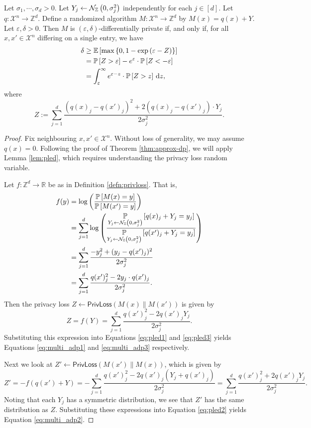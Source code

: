 \documentclass{jpc}
\newcommand{\dgausss}[2]{{\discN\left(#1,#2\right)}}
\newcommand{\dgauss}[1]{\dgausss{0}{#1}}
\newcommand{\ex}[2]{{\ifx&#1& \mathbb{E} \else
\underset{#1}{\mathbb{E}} \fi \left[#2\right]}}
\newcommand{\pr}[2]{{\ifx&#1& \mathbb{P} \else
\underset{#1}{\mathbb{P}} \fi \left[#2\right]}}
\newcommand{\eps}{\varepsilon}
\newcommand{\privloss}[2]{\mathsf{PrivLoss}\left(#1\middle\|#2\right)}
\newcommand{\dx}[1][x]{\mathrm{d}#1}
\newcommand{\Z}{\mathbb{Z}}
\newcommand{\R}{\mathbb{R}}
\begin{document}
\begin{thm}
\label{thm:priv3}
Let $\sigma_1, \cdots, \sigma_d >0$. Let $Y_j \gets \dgauss{\sigma_j^2}$ independently for each $j \in [d]$. Let $q\colon \mathcal{X}^n \to \Z^d$. Define a randomized algorithm $M\colon \mathcal{X}^n \to \Z^d$ by $M(x) = q(x)+Y$. Let $\eps,\delta>0$. Then $M$ is $(\eps,\delta)$-differentially private if, and only if, for all $x,x' \in \mathcal{X}^n$ differing on a single entry, we have
\begin{align}
    \delta &\ge \ex{}{\max\left\{ 0 , 1 - \exp\left(\eps - Z \right) \right\}}\label{eq:multi_adp1}\\
    &= \pr{}{Z > \eps} - e^\eps \cdot \pr{}{Z < -\eps}\label{eq:multi_adp2}\\
    &=  \int_\eps^\infty e^{\eps-z} \cdot \pr{}{Z>z} ~\dx[z] \label{eq:multi_adp3},
\end{align}
where 
\begin{equation}
    Z := \sum_{j=1}^d \frac{(q(x)_j-q(x')_j)^2 + 2 (q(x)_j-q(x')_j) \cdot Y_j}{2\sigma_j^2}.
\end{equation}
\end{thm}
\begin{proof}
    Fix neighbouring $x,x' \in \mathcal{X}^n$. Without loss of generality, we may assume $q(x)=0$.
    Following the proof of Theorem \ref{thm:approx-dp}, we will apply Lemma \ref{lem:pled}, which requires understanding the privacy loss random variable.
    
    Let $f\colon \Z^d \to \R$ be as in Definition \ref{defn:privloss}. That is,
    \begin{align*}
        f(y) &= \log\left(\frac{\pr{}{M(x)=y}}{\pr{}{M(x')=y}}\right)\\
        &= \sum_{j=1}^d \log\left(\frac{\pr{Y_j \gets \dgauss{\sigma_j^2}}{q(x)_j+Y_j=y_j}}{\pr{Y_j \gets \dgauss{\sigma_j^2}}{q(x')_j+Y_j=y_j}}\right)\\
        &= \sum_{j=1}^d \frac{-y_j^2 + (y_j-q(x')_j)^2}{2\sigma_j^2}\\
        &= \sum_{j=1}^d \frac{q(x')_j^2 - 2 y_j \cdot q(x')_j}{2\sigma_j^2}.
    \end{align*}
    Then the privacy loss $Z \gets \privloss{M(x)}{M(x')}$ is given by \[Z=f(Y)= \sum_{j=1}^d \frac{q(x')_j^2-2q(x')_j Y_j}{2\sigma_j^2}.\]
    Substituting this expression into Equations \ref{eq:pled1} and \ref{eq:pled3} yields Equations \ref{eq:multi_adp1} and \ref{eq:multi_adp3} respectively.
    
    Next we look at $Z' \gets \privloss{M(x')}{M(x)}$, which is given by \[Z' = -f(q(x')+Y) = -\sum_{j=1}^d \frac{q(x')_j^2 - 2 q(x')_j (Y_j+q(x')_j)}{2\sigma_j^2} = \sum_{j=1}^d \frac{q(x')_j^2 + 2 q(x')_j Y_j}{2\sigma_j^2}.\]
    Noting that each $Y_j$ has a symmetric distribution, we see that $Z'$ has the same distribution as $Z$.
    Substituting these expressions into Equation \ref{eq:pled2} yields Equation \ref{eq:multi_adp2}.
\end{proof}
\end{document}
